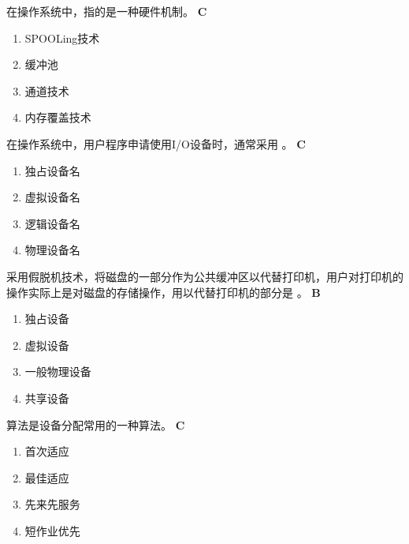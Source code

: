 \begin{problem}
	在操作系统中，\myline 指的是一种硬件机制。
	\textbf{C}
	\vspace{-0.5em}
	\begin{multicols}{4}
		\begin{enumerate}[label=\Alph*.]
			\item SPOOLing技术
			\item 缓冲池
			\item 通道技术
			\item 内存覆盖技术
		\end{enumerate}
	\end{multicols}
	\vspace{-1em}
\end{problem}


\begin{problem}
	在操作系统中，用户程序申请使用I/O设备时，通常采用 \myline。
	\textbf{C}
	\vspace{-0.5em}
	\begin{multicols}{4}
		\begin{enumerate}[label=\Alph*.]
			\item 独占设备名
			\item 虚拟设备名
			\item 逻辑设备名
			\item 物理设备名
		\end{enumerate}
	\end{multicols}
	\vspace{-1em}
\end{problem}


\begin{problem}
	采用假脱机技术，将磁盘的一部分作为公共缓冲区以代替打印机，用户对打印机的操作实际上是对磁盘的存储操作，用以代替打印机的部分是 \myline。
	\textbf{B}
	\vspace{-0.5em}
	\begin{multicols}{4}
		\begin{enumerate}[label=\Alph*.]
			\item 独占设备
			\item 虚拟设备
			\item 一般物理设备
			\item 共享设备
		\end{enumerate}
	\end{multicols}
	\vspace{-1em}
\end{problem}


\begin{problem}
	\myline 算法是设备分配常用的一种算法。
	\textbf{C}
	\vspace{-0.5em}
	\begin{multicols}{4}
		\begin{enumerate}[label=\Alph*.]
			\item 首次适应
			\item 最佳适应
			\item 先来先服务
			\item 短作业优先
		\end{enumerate}
	\end{multicols}
	\vspace{-1em}
\end{problem}



